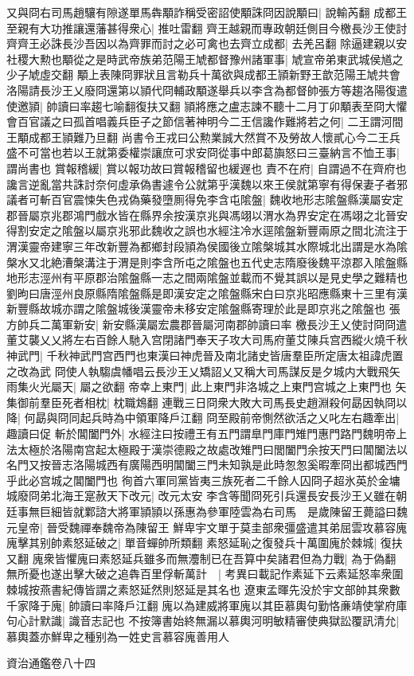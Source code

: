 又與冏右司馬趙驤有隙遂單馬犇顒詐稱受密詔使顒誅冏因說顒曰|{
	說輸芮翻}
成都王至親有大功推讓還藩甚得衆心|{
	推吐雷翻}
齊王越親而專政朝廷側目今檄長沙王使討齊齊王必誅長沙吾因以為齊罪而討之必可禽也去齊立成都|{
	去羌呂翻}
除逼建親以安社稷大勲也顒從之是時武帝族弟范陽王虓都督豫州諸軍事|{
	虓宣帝弟東武城侯馗之少子虓虛交翻}
顒上表陳冏罪狀且言勒兵十萬欲與成都王頴新野王歆范陽王虓共會洛陽請長沙王乂廢冏還第以頴代冏輔政顒遂舉兵以李含為都督帥張方等趨洛陽復遣使邀頴|{
	帥讀曰率趨七喻翻復扶又翻}
頴將應之盧志諫不聽十二月丁卯顒表至冏大懼會百官議之曰孤首唱義兵臣子之節信著神明今二王信讒作難將若之何|{
	二王謂河間王顒成都王頴難乃旦翻}
尚書令王戎曰公勲業誠大然賞不及勞故人懷貳心今二王兵盛不可當也若以王就第委權崇讓庶可求安冏從事中郎葛旟怒曰三臺納言不恤王事|{
	謂尚書也}
賞報稽緩|{
	賞以報功故曰賞報稽留也緩遟也}
責不在府|{
	自謂過不在齊府也}
讒言逆亂當共誅討奈何虛承偽書遽令公就第乎漢魏以來王侯就第寧有得保妻子者邪議者可斬百官震悚失色戎偽藥發墮厠得免李含屯隂盤|{
	魏收地形志隂盤縣漢屬安定郡晉屬京兆郡鴻門戲水皆在縣界余按漢京兆與馮翊以渭水為界安定在馮翊之北晉安得割安定之隂盤以屬京兆邪此魏收之誤也水經注冷水逕隂盤新豐兩原之間北流注于渭漢靈帝建寧三年改新豐為都鄉封段頴為侯國後立隂槃城其水際城北出謂是水為隂槃水又北絶漕槃溝注于渭是則李含所屯之隂盤也五代史志隋廢後魏平涼郡入隂盤縣地形志涇州有平原郡治隂盤縣一志之間兩隂盤並載而不覺其誤以是見史學之難精也劉昫曰唐涇州良原縣隋隂盤縣是即漢安定之隂盤縣宋白曰京兆昭應縣東十三里有漢新豐縣故城亦謂之隂盤城後漢靈帝未移安定隂盤縣寄理於此是即京兆之隂盤也}
張方帥兵二萬軍新安|{
	新安縣漢屬宏農郡晉屬河南郡帥讀曰率}
檄長沙王乂使討冏冏遣董艾襲乂乂將左右百餘人馳入宫閉諸門奉天子攻大司馬府董艾陳兵宫西縱火燒千秋神武門|{
	千秋神武門宫西門也東漢曰神虎晉及南北諸史皆唐羣臣所定唐太祖諱虎置之改為武}
冏使人執騶虞幡唱云長沙王乂矯詔乂又稱大司馬謀反是夕城内大戰飛矢雨集火光屬天|{
	屬之欲翻}
帝幸上東門|{
	此上東門非洛城之上東門宫城之上東門也}
矢集御前羣臣死者相枕|{
	枕職鴆翻}
連戰三日冏衆大敗大司馬長史趙淵殺何勗因執冏以降|{
	何勗與冏同起兵時為中領軍降戶江翻}
冏至殿前帝惻然欲活之乂叱左右趣牽出|{
	趣讀曰促}
斬於閶闔門外|{
	水經注曰按禮王有五門謂臯門庫門雉門惠門路門魏明帝上法太極於洛陽南宫起太極殿于漢崇德殿之故處改雉門曰閭闔門余按天門曰閶闔法以名門又按晉志洛陽城西有廣陽西明閶闔三門未知孰是此時怱怱奚暇牽冏出都城西門乎此必宫城之閶闔門也}
徇首六軍同黨皆夷三族死者二千餘人囚冏子超氷英於金墉城廢冏弟北海王寔赦天下改元|{
	改元太安}
李含等聞冏死引兵還長安長沙王乂雖在朝廷事無巨細皆就鄴諮大將軍頴頴以孫惠為參軍陸雲為右司馬　是歲陳留王薨謚曰魏元皇帝|{
	晉受魏禪奉魏帝為陳留王}
鮮卑宇文單于莫圭部衆彊盛遣其弟屈雲攻慕容廆廆擊其别帥素怒延破之|{
	單音蟬帥所類翻}
素怒延恥之復發兵十萬圍廆於棘城|{
	復扶又翻}
廆衆皆懼廆曰素怒延兵雖多而無灋制已在吾算中矣諸君但為力戰|{
	為于偽翻}
無所憂也遂出擊大破之追犇百里俘斬萬計　|{
	考異曰載記作素延下云素延怒率衆圍棘城按燕書紀傳皆謂之素怒延然則怒延是其名也}
遼東孟暉先没於宇文部帥其衆數千家降于廆|{
	帥讀曰率降戶江翻}
廆以為建威將軍廆以其臣慕輿句勤恪亷靖使掌府庫句心計默識|{
	識音志記也}
不按簿書始終無漏以慕輿河明敏精審使典獄訟覆訊清允|{
	慕輿蓋亦鮮卑之種别為一姓史言慕容廆善用人}


資治通鑑卷八十四
